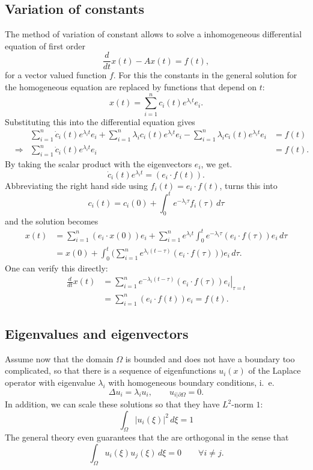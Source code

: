 \subsection{Variation of constants}
The method of variation of constant allows to solve a inhomogeneous
differential equation of first order
\[
\frac{d}{dt}x(t)-Ax(t)=f(t),
\]
for a vector valued function $f$.
For this the constants in the general solution for the homogeneous 
equation are replaced by functions that depend on $t$:
\[
x(t)=\sum_{i=1}^nc_i(t)e^{\lambda_it}e_i.
\]
Substituting this into the differential equation gives
\begin{align*}
&&
\sum_{i=1}^n\dot c_i(t)e^{\lambda_it}e_i
+
\sum_{i=1}^n\lambda_i c_i(t)e^{\lambda_it}e_i
-\sum_{i=1}^n\lambda_i c_i(t)e^{\lambda_it}e_i
&=
f(t)
\\
&\Rightarrow&
\sum_{i=1}^n\dot c_i(t)e^{\lambda_it}e_i
&=
f(t).
\end{align*}
By taking the scalar product with the eigenvectors
$e_i$, we get.
\[
\dot c_i(t)e^{\lambda_i t}=(e_i\cdot f(t)).
\]
Abbreviating the right hand side using
$f_i(t)=e_i\cdot f(t)$, turns this into
\[
c_i(t)=c_i(0)+\int_0^te^{-\lambda_i \tau}f_i(\tau)\,d\tau
\]
and the solution becomes
\begin{align*}
x(t)&=
\sum_{i=1}^n
(e_i\cdot x(0))e_i+
\sum_{i=1}^ne^{\lambda_i t}\int_0^te^{-\lambda_i \tau}(e_i\cdot f(\tau))e_i\,d\tau
\\
&=
x(0)
+
\int_0^t
\biggl(
\sum_{i=1}^n
e^{\lambda_i(t- \tau)}(e_i\cdot f(\tau))\biggr)e_i\,d\tau.
\end{align*}
One can verify this directly:
\begin{align*}
\frac{d}{dt}x(t)
&=
\sum_{i=1}^n\left.e^{-\lambda_i (t-\tau)}(e_i\cdot f(\tau))e_i \right|_{\tau=t}
\\
&=
\sum_{i=1}^n(e_i\cdot f(t))e_i=f(t).
\end{align*}

\subsection{Eigenvalues and eigenvectors}
Assume now that the domain $\Omega$ is bounded and does not have a 
boundary too complicated, so that there is a sequence of eigenfunctions
$u_i(x)$ of the Laplace operator with eigenvalue $\lambda_i$
with homogeneous boundary conditions, i.~e.
\[
\Delta u_i=\lambda_iu_i,\qquad u_{i|\partial\Omega} = 0.
\]
In addition, we can scale these solutions so that they have 
$L^2$-norm $1$:
\[
\int_{\Omega}|u_i(\xi)|^2\,d\xi=1
\]
The general theory even guarantees that the are orthogonal in the sense
that
\[
\int_{\Omega}u_i(\xi)u_j(\xi)\,d\xi=0\qquad\forall i\ne j.
\]

